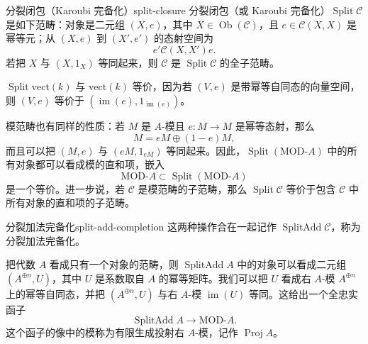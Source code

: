 \begin{definition}{分裂闭包（Karoubi 完备化）}{split-closure}
分裂闭包（或 Karoubi 完备化）$\operatorname{Split}\mathcal C$ 是如下范畴：对象是二元组 $(X,e)$，其中 $X\in\operatorname{Ob}(\mathcal C)$，且 $e\in\mathcal C(X,X)$ 是幂等元；从 $(X,e)$ 到 $(X',e')$ 的态射空间为
\[
  e'\mathcal C(X,X')e.
\]
若把 $X$ 与 $(X,1_X)$ 等同起来，则 $\mathcal C$ 是 $\operatorname{Split}\mathcal C$ 的全子范畴。
\end{definition}

\begin{example}[向量空间范畴的分裂闭包]\label{ex:split-vect}
$\operatorname{Split}\mathrm{vect}(k)$ 与 $\mathrm{vect}(k)$ 等价，因为若 $(V,e)$ 是带幂等自同态的向量空间，则 $(V,e)$ 等价于 $(\operatorname{im}(e),1_{\operatorname{im}(e)})$。
\end{example}

模范畴也有同样的性质：若 $M$ 是 $A$-模且 $e\colon M\to M$ 是幂等态射，那么
\[
  M=eM\oplus(1-e)M,
\]
而且可以把 $(M,e)$ 与 $(eM,1_{eM})$ 等同起来。因此，$\operatorname{Split}(\mathrm{MOD}\text{-}A)$ 中的所有对象都可以看成模的直和项，嵌入
\[
  \mathrm{MOD}\text{-}A\subset\operatorname{Split}(\mathrm{MOD}\text{-}A)
\]
是一个等价。进一步说，若 $\mathcal C$ 是模范畴的子范畴，那么 $\operatorname{Split}\mathcal C$ 等价于包含 $\mathcal C$ 中所有对象的直和项的子范畴。

\begin{definition}{分裂加法完备化}{split-add-completion}
这两种操作合在一起记作 $\operatorname{SplitAdd}\mathcal C$，称为分裂加法完备化。
\end{definition}

\begin{example}[有限生成投射模]\label{ex:projective-modules}
把代数 $A$ 看成只有一个对象的范畴，则 $\operatorname{SplitAdd}A$ 中的对象可以看成二元组 $(A^{\oplus n},U)$，其中 $U$ 是系数取自 $A$ 的幂等矩阵。我们可以把 $U$ 看成右 $A$-模 $A^{\oplus n}$ 上的幂等自同态，并把 $(A^{\oplus n},U)$ 与右 $A$-模 $\operatorname{im}(U)$ 等同。这给出一个全忠实函子
\[
  \operatorname{SplitAdd}A\to\mathrm{MOD}\text{-}A.
\]
这个函子的像中的模称为有限生成投射右 $A$-模，记作 $\operatorname{Proj}A$。
\end{example}


